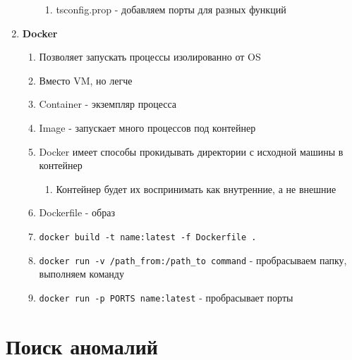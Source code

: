 \documentclass[a4paper, 12pt]{article}
\begin{document}
\begin{enumerate}
\begin{enumerate}
    \begin{enumerate}
      \item tsconfig.prop - добавляем порты для разных функций
    \end{enumerate}
  \end{enumerate} 
  \item \textbf{Docker}
  \begin{enumerate}
    \item Позволяет запускать процессы изолированно от OS 
    \item Вместо VM, но легче
    \item Container - экземпляр процесса
    \item Image - запускает много процессов под контейнер
    \item Docker имеет способы прокидывать директории с исходной машины в контейнер
    \begin{enumerate}
      \item Контейнер будет их воспринимать как внутренние, а не внешние
    \end{enumerate}
    \item Dockerfile - образ
    \item \verb+docker build -t name:latest -f Dockerfile .+
    \item \verb+docker run -v /path_from:/path_to command+ - пробрасываем папку, выполняем команду
    \item \verb+docker run -p PORTS name:latest+ - пробрасывает порты
  \end{enumerate}
\end{enumerate}

\section{Поиск аномалий}
\end{document}
